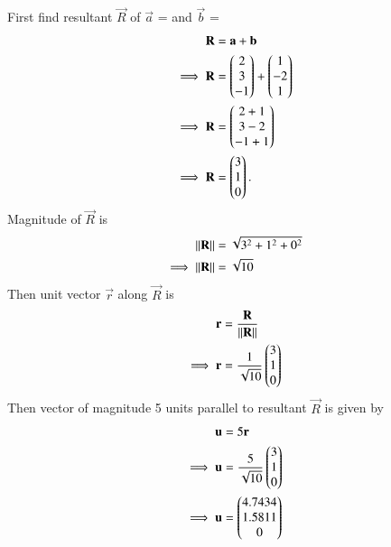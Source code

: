 First find resultant $\vec{R}$ of $\vec{a}$ =  and $\vec{b}$ = 
\begin{align}
  \mathbf{R} &=\mathbf{a}+\mathbf{b}\\
  \implies\mathbf{R} &=\begin{pmatrix}2\\ 3\\ -1\end{pmatrix}+\begin{pmatrix}1\\ -2\\ 1\end{pmatrix} \\
  \implies\mathbf{R} &= \begin{pmatrix}2+1\\ 3-2\\ -1+1\end{pmatrix} \\
  \implies\mathbf{R} &= \begin{pmatrix}3\\ 1\\ 0\end{pmatrix}.
\end{align}
Magnitude of $\vec{R}$ is
\begin{align}
  \left\lVert\mathbf{R}\right\rVert &= \sqrt{3^2+1^2+0^2}\\
  \implies\left\lVert\mathbf{R}\right\rVert &= \sqrt{10}\\
\end{align}
Then unit vector $\vec{r}$ along $\vec{R}$ is
\begin{align}
  \mathbf{r} &= \frac{\mathbf{R}}{\left\lVert\mathbf{R}\right\rVert}\\
  \implies\mathbf{r} &= \frac{1}{\sqrt{10}}\begin{pmatrix}3\\ 1\\ 0\end{pmatrix}
\end{align}
Then vector of magnitude 5 units parallel to resultant $\vec{R}$ is given by
\begin{align}
  \mathbf{u} &= 5\mathbf{r}\\
  \implies\mathbf{u} &= \frac{5}{\sqrt{10}}\begin{pmatrix}3\\ 1\\ 0\end{pmatrix}\\
  \implies\mathbf{u} &= \begin{pmatrix}4.7434\\ 1.5811\\ 0\end{pmatrix}
\end{align}
